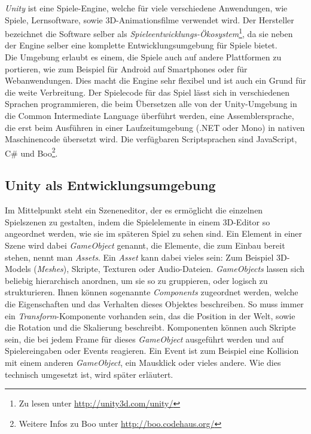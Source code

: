 \textit{Unity} ist eine Spiele-Engine, welche für viele verschiedene Anwendungen, wie Spiele, Lernsoftware, sowie 3D-Animationsfilme verwendet wird. Der Hersteller bezeichnet die Software selber als \textit{Spieleentwicklungs-Ökosystem}\footnote{Zu lesen unter \url{http://unity3d.com/unity/}}, da sie neben der Engine selber eine komplette Entwicklungsumgebung für Spiele bietet.\\
Die Umgebung erlaubt es einem, die Spiele auch auf andere Plattformen zu portieren, wie zum Beispiel für Android auf Smartphones oder für Webanwendungen. Dies macht die Engine sehr flexibel und ist auch ein Grund für die weite Verbreitung. Der Spielecode für das Spiel lässt sich in verschiedenen Sprachen programmieren, die beim Übersetzen alle von der Unity-Umgebung in die Common Intermediate Language überführt werden, eine Assemblersprache, die erst beim Ausführen in einer Laufzeitumgebung (.NET oder Mono) in nativen Maschinencode übersetzt wird. Die verfügbaren Scriptsprachen sind JavaScript, C\# und Boo\footnote{Weitere Infos zu Boo unter \url{http://boo.codehaus.org/}}.

\subsection{Unity als Entwicklungsumgebung} 

Im Mittelpunkt steht ein Szeneneditor, der es ermöglicht die einzelnen Spielszenen zu gestalten, indem die Spielelemente in einem 3D-Editor so angeordnet werden, wie sie im späteren Spiel zu sehen sind. 
Ein Element in einer Szene wird dabei \textit{GameObject} genannt, die Elemente, die zum Einbau bereit stehen, nennt man \textit{Assets}. Ein \textit{Asset} kann dabei vieles sein: Zum Beispiel 3D-Models (\textit{Meshes}), Skripte, Texturen oder Audio-Dateien. \textit{GameObjects} lassen sich beliebig hierarchisch anordnen, um sie so zu gruppieren, oder logisch zu strukturieren. Ihnen können sogenannte \textit{Components} zugeordnet werden, welche die Eigenschaften und das Verhalten dieses Objektes beschreiben. So muss immer ein \textit{Transform}-Komponente vorhanden sein, das die Position in der Welt, sowie die Rotation und die Skalierung beschreibt. Komponenten können auch Skripte sein, die bei jedem Frame für dieses \textit{GameObject} ausgeführt werden und auf Spielereingaben oder Events reagieren. Ein Event ist zum Beispiel eine Kollision mit einem anderen \textit{GameObject}, ein Mausklick oder vieles andere. Wie dies technisch umgesetzt ist, wird später erläutert.

